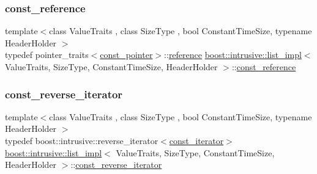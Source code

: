 \subsubsection{\texorpdfstring{const\+\_\+reference}{const\_reference}}
{\footnotesize\ttfamily template$<$class Value\+Traits , class Size\+Type , bool Constant\+Time\+Size, typename Header\+Holder $>$ \\
typedef pointer\+\_\+traits$<$\hyperlink{classboost_1_1intrusive_1_1list__impl_abc0f6e1c4c5f44b9edd5b96e798a618c}{const\+\_\+pointer}$>$\+::\hyperlink{classboost_1_1intrusive_1_1list__impl_a881763b587dbe7c0237a552a9e89755a}{reference} \hyperlink{classboost_1_1intrusive_1_1list__impl}{boost\+::intrusive\+::list\+\_\+impl}$<$ Value\+Traits, Size\+Type, Constant\+Time\+Size, Header\+Holder $>$\+::\hyperlink{classboost_1_1intrusive_1_1list__impl_a3d37629151c76fb8389ac3ba3b359201}{const\+\_\+reference}}

\mbox{\label{classboost_1_1intrusive_1_1list__impl_a00a0933ca1d92836a220a604e521d9c4}} 
\subsubsection{\texorpdfstring{const\+\_\+reverse\+\_\+iterator}{const\_reverse\_iterator}}
{\footnotesize\ttfamily template$<$class Value\+Traits , class Size\+Type , bool Constant\+Time\+Size, typename Header\+Holder $>$ \\
typedef boost\+::intrusive\+::reverse\+\_\+iterator$<$\hyperlink{classboost_1_1intrusive_1_1list__impl_af4ced710fe02662c5650d161af83d8cd}{const\+\_\+iterator}$>$ \hyperlink{classboost_1_1intrusive_1_1list__impl}{boost\+::intrusive\+::list\+\_\+impl}$<$ Value\+Traits, Size\+Type, Constant\+Time\+Size, Header\+Holder $>$\+::\hyperlink{classboost_1_1intrusive_1_1list__impl_a00a0933ca1d92836a220a604e521d9c4}{const\+\_\+reverse\+\_\+iterator}}

\mbox{\label{classboost_1_1intrusive_1_1list__impl_a7053eac84f0c15a33c8192687d0840e3}} 
